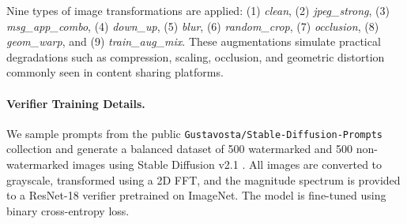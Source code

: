 \documentclass[lettersize,journal,review]{IEEEtran}
\begin{document}
Nine types of image transformations are applied:  
(1) \textit{clean}, (2) \textit{jpeg\_strong}, (3) \textit{msg\_app\_combo}, (4) \textit{down\_up}, (5) \textit{blur}, (6) \textit{random\_crop}, (7) \textit{occlusion}, (8) \textit{geom\_warp}, and (9) \textit{train\_aug\_mix}.  
These augmentations simulate practical degradations such as compression, scaling, occlusion, and geometric distortion commonly seen in content sharing platforms.


\paragraph{Verifier Training Details.}
We sample prompts from the public \texttt{Gustavosta/Stable-Diffusion-Prompts} collection and generate a balanced dataset of 500 watermarked and 500 non-watermarked images using Stable Diffusion v2.1 \cite{rombach2022stable}.
All images are converted to grayscale, transformed using a 2D FFT, and the magnitude spectrum is provided to a ResNet-18 verifier pretrained on ImageNet.
The model is fine-tuned using binary cross-entropy loss.




\end{document}
